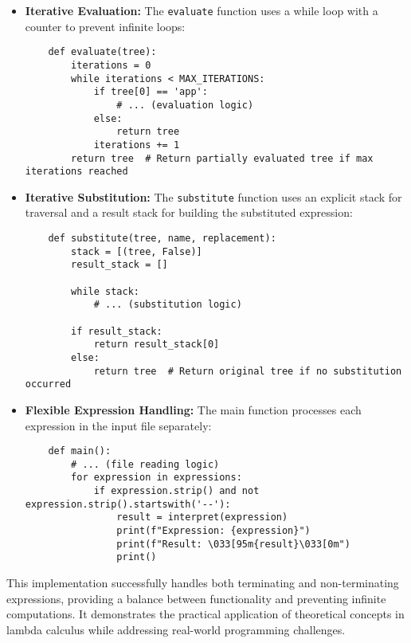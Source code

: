 \begin{itemize}
    \item \textbf{Iterative Evaluation:} The \texttt{evaluate} function uses a while loop with a counter to prevent infinite loops:
    
    \begin{verbatim}
    def evaluate(tree):
        iterations = 0
        while iterations < MAX_ITERATIONS:
            if tree[0] == 'app':
                # ... (evaluation logic)
            else:
                return tree
            iterations += 1
        return tree  # Return partially evaluated tree if max iterations reached
    \end{verbatim}
    
    \item \textbf{Iterative Substitution:} The \texttt{substitute} function uses an explicit stack for traversal and a result stack for building the substituted expression:
    
    \begin{verbatim}
    def substitute(tree, name, replacement):
        stack = [(tree, False)]
        result_stack = []
        
        while stack:
            # ... (substitution logic)
        
        if result_stack:
            return result_stack[0]
        else:
            return tree  # Return original tree if no substitution occurred
    \end{verbatim}
    
    \item \textbf{Flexible Expression Handling:} The main function processes each expression in the input file separately:
    
    \begin{verbatim}
    def main():
        # ... (file reading logic)
        for expression in expressions:
            if expression.strip() and not expression.strip().startswith('--'):
                result = interpret(expression)
                print(f"Expression: {expression}")
                print(f"Result: \033[95m{result}\033[0m")
                print()
    \end{verbatim}
\end{itemize}

This implementation successfully handles both terminating and non-terminating expressions, providing a balance between functionality and preventing infinite computations. It demonstrates the practical application of theoretical concepts in lambda calculus while addressing real-world programming challenges.

